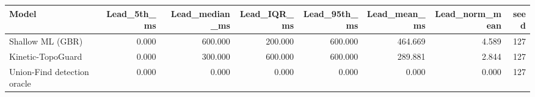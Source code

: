 \begin{tabular}{lrrrrrrr}
\toprule
Model & Lead\_5th\_ms & Lead\_median\_ms & Lead\_IQR\_ms & Lead\_95th\_ms & Lead\_mean\_ms & Lead\_norm\_mean & seed \\
\midrule
Shallow ML (GBR) & 0.000 & 600.000 & 200.000 & 600.000 & 464.669 & 4.589 & 127 \\
Kinetic-TopoGuard & 0.000 & 300.000 & 600.000 & 600.000 & 289.881 & 2.844 & 127 \\
Union-Find detection oracle & 0.000 & 0.000 & 0.000 & 0.000 & 0.000 & 0.000 & 127 \\
\bottomrule
\end{tabular}